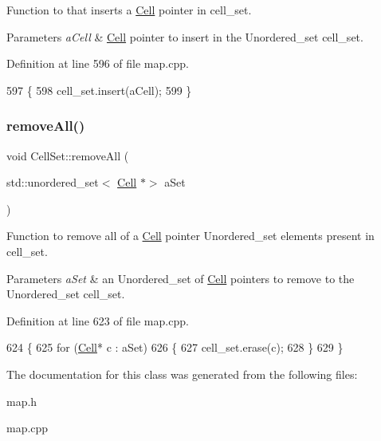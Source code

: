 Function to that inserts a \hyperlink{class_cell}{Cell} pointer in cell\+\_\+set. 


\begin{DoxyParams}{Parameters}
{\em a\+Cell} & \hyperlink{class_cell}{Cell} pointer to insert in the Unordered\+\_\+set cell\+\_\+set. \\
\hline
\end{DoxyParams}


Definition at line 596 of file map.\+cpp.


\begin{DoxyCode}
597 \{
598     cell\_set.insert(aCell);
599 \}
\end{DoxyCode}
\hypertarget{class_cell_set_a13671e16ec2d31a9d5ae628f0df87890}{}\label{class_cell_set_a13671e16ec2d31a9d5ae628f0df87890} 
\subsubsection{\texorpdfstring{remove\+All()}{removeAll()}}
{\footnotesize\ttfamily void Cell\+Set\+::remove\+All (\begin{DoxyParamCaption}\item[{std\+::unordered\+\_\+set$<$ \hyperlink{class_cell}{Cell} $\ast$$>$}]{a\+Set }\end{DoxyParamCaption})}



Function to remove all of a \hyperlink{class_cell}{Cell} pointer Unordered\+\_\+set elements present in cell\+\_\+set. 


\begin{DoxyParams}{Parameters}
{\em a\+Set} & an Unordered\+\_\+set of \hyperlink{class_cell}{Cell} pointers to remove to the Unordered\+\_\+set cell\+\_\+set. \\
\hline
\end{DoxyParams}


Definition at line 623 of file map.\+cpp.


\begin{DoxyCode}
624 \{
625     \textcolor{keywordflow}{for} (\hyperlink{class_cell}{Cell}* c : aSet)
626     \{
627         cell\_set.erase(c);
628     \}
629 \}
\end{DoxyCode}


The documentation for this class was generated from the following files\+:\begin{DoxyCompactItemize}
\item 
map.\+h\item 
map.\+cpp\end{DoxyCompactItemize}
